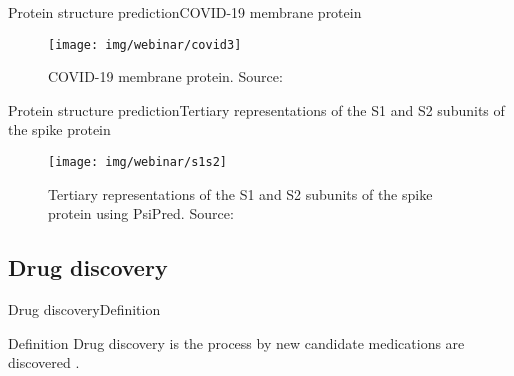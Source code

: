 \documentclass[10pt]{beamer}
\newcommand{\1}{
        	\setbeamertemplate{background}{
        		\texttt{[image: img/1]}
        		\tikz[overlay] \fill[fill opacity=0.75,fill=white] (0,0) rectangle (-\paperwidth,\paperheight);
        	}
}
\begin{document}
\begin{frame}{Protein structure prediction}{COVID-19 membrane protein}
	\begin{figure}[]
		\centering
		\texttt{[image: img/webinar/covid3]}
		\label{img:mot2}
		\caption{COVID-19 membrane protein. Source: \cite{alphafold2020}}
	\end{figure}
\end{frame}


\begin{frame}{Protein structure prediction}{Tertiary representations of the S1 and S2 subunits of the spike protein}
	\begin{figure}[]
		\centering
		\texttt{[image: img/webinar/s1s2]}
		\label{img:mot2}
		\caption{Tertiary representations of the S1 and S2 subunits of the spike protein using PsiPred. Source: \cite{spiga2003molecular}}
	\end{figure}
\end{frame}




\subsection{Drug discovery}

\begin{frame}{Drug discovery}{Definition}
	\begin{block}{Definition}
		Drug discovery is the process by new candidate medications are discovered \cite{usafooddrug2020}.
	\end{block}
\end{frame}
\end{document}
